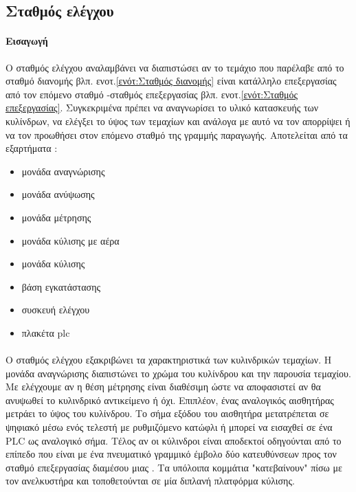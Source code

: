 \documentclass[a4paper,12pt,twoside]{report}
\begin{document}
			\FloatBarrier
			\subsection{Σταθμός ελέγχου \cite{FestoMPSTestingStationManual} \cite{ΤοΦυσικόΣύστημαFestoMPS} \cite{UMLΕνσωματωμέναΣυστήματα}}
			
			\label{ενότ:Σταθμός ελέγχου}
				\paragraph{Εισαγωγή} {Ο σταθμός ελέγχου αναλαμβάνει να διαπιστώσει αν το τεμάχιο που παρέλαβε από το σταθμό διανομής {\footnotesize βλπ. ενοτ.\ref{ενότ:Σταθμός διανομής}} είναι κατάλληλο επεξεργασίας από τον επόμενο σταθμό -σταθμός επεξεργασίας {\footnotesize βλπ. ενοτ.\ref{ενότ:Σταθμός επεξεργασίας}}. Συγκεκριμένα πρέπει να αναγνωρίσει το υλικό κατασκευής των κυλίνδρων, να ελέγξει το ύψος των τεμαχίων και ανάλογα με αυτό να τον απορρίψει  ή να τον προωθήσει στον επόμενο σταθμό της γραμμής παραγωγής. Αποτελείται από τα εξαρτήματα :
				}
				\begin{itemize}
					\item μονάδα αναγνώρισης
					\item μονάδα ανύψωσης
					\item μονάδα μέτρησης
					\item μονάδα κύλισης με αέρα
					\item μονάδα κύλισης
					\item βάση εγκατάστασης
					\item συσκευή ελέγχου
					\item πλακέτα plc
				\end{itemize}
				\paragraph{} {Ο σταθμός ελέγχου εξακριβώνει τα χαρακτηριστικά των κυλινδρικών τεμαχίων. Η μονάδα αναγνώρισης διαπιστώνει το χρώμα του κυλίνδρου και την παρουσία τεμαχίου. Με  ελέγχουμε αν η θέση μέτρησης είναι διαθέσιμη ώστε να αποφασιστεί αν θα ανυψωθεί το κυλινδρικό αντικείμενο ή όχι. Επιπλέον, ένας \gls{αναλογικός αισθητήρας} μετράει το ύψος του κυλίνδρου. Το σήμα εξόδου του αισθητήρα μετατρέπεται σε ψηφιακό μέσω ενός τελεστή με ρυθμιζόμενο κατώφλι ή μπορεί να εισαχθεί σε ένα PLC ως αναλογικό σήμα. Τέλος αν οι κύλινδροι είναι αποδεκτοί οδηγούνται από το επίπεδο που είναι με ένα πνευματικό \gls{γραμμικό έμβολο} δύο κατευθύνσεων προς τον σταθμό επεξεργασίας διαμέσου μιας . Τα υπόλοιπα κομμάτια "κατεβαίνουν" πίσω με τον ανελκυστήρα και τοποθετούνται σε μία διπλανή \gls{πλατφόρμα κύλισης}.
				}
				
\end{document}
